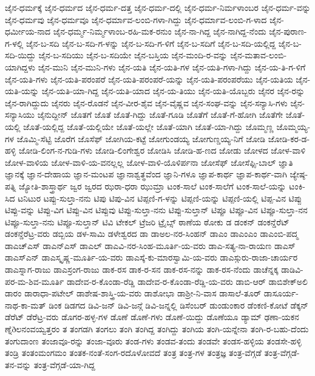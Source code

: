 ಜೈನ-ಧರ್ಮಕ್ಕೆ
ಜೈನ-ಧರ್ಮದ
ಜೈನ-ಧರ್ಮ-ದತ್ತ
ಜೈನ-ಧರ್ಮ-ದಲ್ಲಿ
ಜೈನ-ಧರ್ಮ-ನಿರ್ಮಳಾಂಬರ
ಜೈನ-ಧರ್ಮ-ವನ್ನು
ಜೈನ-ಧರ್ಮವು
ಜೈನ-ಧರ್ಮವೂ
ಜೈನ-ಧರ್ಮಾವ-ಲಂಬಿ-ಗಳಾ-ಗಿದ್ದು
ಜೈನ-ಧರ್ಮಾವ-ಲಂಬಿ-ಗ-ಳಾದ
ಜೈನ-ಧರ್ಮೀಯ-ನಾದ
ಜೈನ-ಧರ್ಮ್ಮ-ನಿರ್ಮ್ಮಳಾಂಬ-ರಹಿ-ಮಕ-ರನುಂ
ಜೈನ-ನಾ-ಗಿದ್ದ
ಜೈನ-ನಾಗಿದ್ದ-ನೆಂದು
ಜೈನ-ಪುರಾಣ-ಗ-ಳಲ್ಲಿ
ಜೈನ-ಬ-ಸದಿ
ಜೈನ-ಬ-ಸದಿ-ಗ-ಳನ್ನು
ಜೈನ-ಬ-ಸದಿ-ಗ-ಳಿಗೆ
ಜೈನ-ಬ-ಸದಿಗೆ
ಜೈನ-ಬ-ಸದಿ-ಯಲ್ಲಿದ್ದ
ಜೈನ-ಬ-ಸದಿ-ಯಿದ್ದು
ಜೈನ-ಬ-ಸದಿಯು
ಜೈನ-ಬ-ಸದಿಯೇ
ಜೈನ-ಬಸ್ತಿಯ
ಜೈನ-ಮಂದಿ-ರ-ವನ್ನು
ಜೈನ-ಮತಾವ-ಲಂಬಿ-ಯಾಗಿದ್ದಳು
ಜೈನ-ಮುನಿ
ಜೈನ-ಮುನಿ-ಗಳು
ಜೈನ-ಯತಿ
ಜೈನ-ಯತಿ-ಗಳ
ಜೈನ-ಯತಿ-ಗಳಾ-ಗಿದ್ದು
ಜೈನ-ಯ-ತಿ-ಗ-ಳಿಗೆ
ಜೈನ-ಯತಿ-ಗಳು
ಜೈನ-ಯತಿ-ಪರಂಪರೆ
ಜೈನ-ಯತಿ-ಪರಂಪರೆ-ಯನ್ನು
ಜೈನ-ಯತಿ-ಪರಂಪರೆಯು
ಜೈನ-ಯತಿಯ
ಜೈನ-ಯತಿ-ಯನ್ನು
ಜೈನ-ಯತಿ-ಯಾ-ಗಿದ್ದ
ಜೈನ-ಯತಿ-ಯಾದ
ಜೈನ-ಯ-ತಿಯು
ಜೈನ-ಯತಿ-ಯೊಬ್ಬರು
ಜೈನರ
ಜೈನ-ರನ್ನು
ಜೈನ-ರಾಗಿದ್ದುದು
ಜೈನರು
ಜೈನ-ರೊಡನೆ
ಜೈನ-ವೀರ-ಶೈವ
ಜೈನ-ವೈಷ್ಣವ
ಜೈನ-ಸಂಘ-ವನ್ನು
ಜೈನ-ಸನ್ಯಾಸಿ-ಗಳು
ಜೈನ-ಸನ್ಯಾಸಿಯು
ಜೈನುದ್ದೀನ್
ಜೊತಗೆ
ಜೊತೆ
ಜೊತೆ-ಗಿದ್ದು
ಜೊತೆ-ಗೂಡಿ
ಜೊತೆಗೆ
ಜೊತೆ-ಗೆ-ಹೋಗಿ
ಜೊತೆಗೇ
ಜೊತೆ-ಯಲ್ಲಿ
ಜೊತೆ-ಯಲ್ಲಿದ್ದ
ಜೊತೆ-ಯಲ್ಲಿಯೇ
ಜೊತೆ-ಯಲ್ಲೇ
ಜೊತೆ-ಯಾಗಿ
ಜೊತೆ-ಯಾ-ಗಿದ್ದು
ಜೊಮ್ಮಣ್ಣ
ಜೊಮ್ಮಯ್ಯ-ಗಳ
ಜೊಮ್ಮಿ-ಸೆಟ್ಟಿ
ಜೊರೆಗ
ಜೊಸೆಫ್
ಜೋಗಿಯ-ಕಟ್ಟೆ
ಜೋಗುಂಡಯ್ಯ
ಜೋಗುಣ್ಡಯ್ಯ-ನಿಗೆ
ಜೋಡಿ
ಜೋಡಿ-ಕರ-ಡ-ಹಳ್ಳಿ
ಜೋಡಿ-ಲಿಂಗ-ನ-ಗುಡಿ-ಗಳು
ಜೋಡಿ-ಲಿಂಗೇಶ್ವರ
ಜೋಡಿಸಿ
ಜೋಡಿ-ಹ-ಣದ
ಜೋಡು
ಜೋಳದ
ಜೋಳ-ವಾಳಿ
ಜೋಳ-ವಾಳಿಯ
ಜೋಳ-ವಾಳಿ-ಯ-ವನಲ್ಲಲ್ಲ
ಜೋಳ-ವಾಳಿ-ಯೊಳಿರ್ಪನಾ
ಜೋಸೆಫ್
ಜೋಸೆಫ್ಸಿ-ಬಾಲ್
ಜ್ಞಾತಿ
ಜ್ಞಾನಕ್ಕೆ
ಜ್ಞಾನ-ದೇಹಾಯ
ಜ್ಞಾನ-ಮಂಟಪ
ಜ್ಞಾನಾಶ್ವತ್ಥವೆಂದ
ಜ್ಞಾನಿ-ಗಳೂ
ಜ್ಞಾಪ-ಕಾರ್ಥ
ಜ್ಞಾಪ-ಕಾರ್ಥ-ವಾಗಿ
ಜ್ಯೇಷ್ಠ-ಪತ್ನಿ
ಜ್ಯೋತಿ-ಶಾಸ್ತ್ರಾರ್ಥ
ಜ್ವರ
ಜ್ವರದ
ಝರಾ-ಧರಾ
ಝುಮ್ರಾ
ಟಂಕ-ಸಾಲೆ
ಟಂಕ-ಸಾಲೆಗೆ
ಟಂಕ-ಸಾಲೆ-ಯನ್ನು
ಟಂಕಿ-ಸಿದ
ಟನಿಟುರ
ಟಪ್ಪು-ಸುಲ್ತಾ-ನನು
ಟಿಪು
ಟಿಪು-ವಿನ
ಟಿಪ್ಪಣಿ-ಗ-ಳನ್ನು
ಟಿಪ್ಪಣಿ-ಯನ್ನು
ಟಿಪ್ಪಣಿ-ಯಲ್ಲಿ
ಟಿಪ್ಪ-ವಿನ
ಟಿಪ್ಪು
ಟಿಪ್ಪು-ವನ್ನು
ಟಿಪ್ಪು-ವಿಗ
ಟಿಪ್ಪು-ವಿನ
ಟಿಪ್ಪುವು
ಟಿಪ್ಪು-ಸುಲ್ತಾ-ನನು
ಟಿಪ್ಪು-ಸುಲ್ತಾನ್
ಟಿಪ್ಪೂ
ಟಿಪ್ಪೂ-ವಿನ
ಟಿಪ್ಪೂ-ಸುಲ್ತಾ-ನನ
ಟಿಪ್ಪೂ-ಸುಲ್ತಾ-ನನು
ಟಿಪ್ಪೂ-ಸುಲ್ತಾನ್
ಟಿವಿ
ಟೇಕಲ್
ಟ್ರೆಜರಿ
ಟ್ರೈಬ್ಸ್
ಠಾಣೆಯ
ಠೋಕು
ಡ
ಡಂಕನ್
ಡಂಕನ್ಡೆರೆಟ್
ಡಂಕನ್ಡೆರೆಟ್ರ-ವರು
ಡಬ್ಬಿಯ
ಡಳ-ಸಾಮಿ
ಡಳೇಶ್ವರದ
ಡಾ
ಡಾಅಲ-ನರ-ಸಿಂಹನ್
ಡಾಎಂ
ಡಾಎಂಎಂ
ಡಾಎಂಬಿ-ಪದ್ಮ
ಡಾಎಚ್ಎಸ್
ಡಾಎನ್ಎಸ್
ಡಾಎಲ್
ಡಾಎವಿ-ನರ-ಸಿಂಹ-ಮೂರ್ತಿ-ಯ-ವರು
ಡಾಎ-ಸತ್ಯ-ನಾ-ರಾಯಣ
ಡಾಎಸ್
ಡಾಎಸ್ಎನ್
ಡಾಎಸ್ಕೃಷ್ಣ-ಮೂರ್ತಿ-ಯ-ವರು
ಡಾಎಸ್ಕೆ-ಕು-ಮಾರಸ್ವಾಮಿ-ಯ-ವರು
ಡಾಎಸ್ಗುರು-ರಾಜಾ-ಚಾರ್ಯರ
ಡಾಎಸ್ನಾಗ-ರಾಜು
ಡಾಎಸ್ರಂಗ-ರಾಜು
ಡಾಕ-ರಸ
ಡಾಕ-ರ-ಸನ
ಡಾಕ-ರಸ-ನನ್ನು
ಡಾಕ-ರಸ-ನೆಂದು
ಡಾಚೆನ್ನಕ್ಕ
ಡಾಡಿವಿ-ಪರ-ಮ-ಶಿವ-ಮೂರ್ತಿ
ಡಾದೇವ-ರ-ಕೊಂಡಾ-ರೆಡ್ಡಿ
ಡಾದೇವ-ರ-ಕೊಂಡಾ-ರೆಡ್ಡಿ-ಯ-ವರು
ಡಾಬಿ-ಆರ್
ಡಾಬಿಶೇಕ್ಅಲಿ
ಡಾರಂ
ಡಾರಾಧಾ-ಪಟೇಲ್
ಡಾಶೇಷ-ಶಾಸ್ತ್ರಿ-ಯ-ವರು
ಡಾಶೋಭಾ
ಡಾಶ್ರೀ-ನಿ-ವಾಸ
ಡಾಸಾಲೆ-ತೂರ್
ಡಾಸೂರ್ಯ-ನಾಥ-ಕಾ-ಮತ್
ಡಿಂಕ
ಡಿಡಗದ
ಡಿವಿ-ಜನ್
ಡಿವಿ-ಜನ್ಗೆ
ಡಿವಿ-ಜನ್ನಲ್ಲಿ
ಡಿಸೆಂಬರ್
ಡುಂಡುಂಕಾರ
ಡೆಂಕಣಿ-ಕೋಟೆ
ಡೆಕ್ಕನ್
ಡೆರೆಟ್
ಡೆರೆಟ್ರ-ವರು
ಡೊಗರ-ಹಳ್ಳ-ಗಳ
ಡೊಣೆ
ಡೊಣೆ-ಗಳು
ಡೊಣೆ-ಯಿದ್ದು
ಡೊಣೆಯೂ
ಡ್ಯಾಮ್
ಢಣಾ-ಯಕನ
ಣ್ನೆðಲನಂವಯ್ವತ್ತರಂ
ತ
ತಂಗಡಗಿ
ತಂಗಲು
ತಂಗಿ
ತಂಗಿದ್ದ
ತಂಗಿದ್ದು
ತಂಗಿಯ
ತಂಗಿ-ಯನ್ನೇನಾ
ತಂಗಿ-ರ-ಬಹು-ದೆಂದು
ತಂಗುದಾಂಣ
ತಂಜಾವೂ-ರನ್ನು
ತಂಜಾ-ವೂರು
ತಂಡ-ಗಳು
ತಂಡವ-ತಂದು
ತಂಡವೇ
ತಂಡಸ-ಹಳ್ಳಿಯ
ತಂಡಸೇ-ಹಳ್ಳಿ
ತಂಡ್ರಿ
ತಂತಂಮಂಗಮಂ
ತಂತಕ-ನಂತೆ-ಸಂಗ-ರದೊಳೋವದೆ
ತಂತ್ರ
ತಂತ್ರ-ಗಳ
ತಂತ್ರಜ್ಞ
ತಂತ್ರ-ವೆಗ್ಗಡೆ
ತಂತ್ರ-ವೆಗ್ಗಡೆ-ತನ-ವನ್ನು
ತಂತ್ರ-ವೆಗ್ಗಡೆ-ಯಾ-ಗಿದ್ದ
